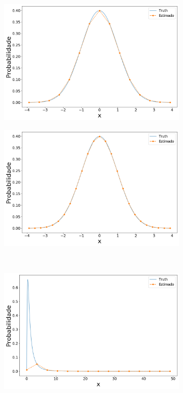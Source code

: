 \begin{figure}[H]
	\centering
	\begin{subfigure}[b]{0.45\textwidth}
		\centering 
		\includegraphics[width=\linewidth]{./figuras/Linspace_normal_15}
		\caption{}
		\label{fig:lin_norm15}
	\end{subfigure}
	\hfill
	\begin{subfigure}[b]{0.45\textwidth}
		\centering 
		\includegraphics[width=\linewidth]{./figuras/Linspace_normal_25}
		\caption{}
		\label{fig:lin_norm25}
	\end{subfigure}
	\\
	\begin{subfigure}[b]{0.45\textwidth}
		\centering 
		\includegraphics[width=\linewidth]{./figuras/Linspace_lognormal_15}

\end{subfigure}
\end{figure}
